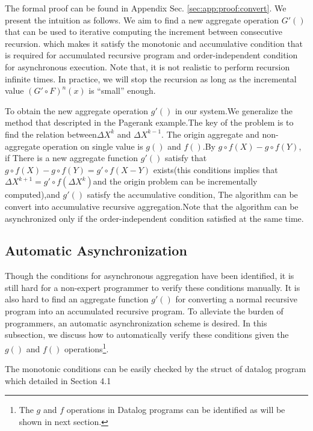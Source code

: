 The formal proof can be found in Appendix Sec. \ref{sec:app:proof:convert}. We present the intuition as follows. We aim to find a new aggregate operation $G'()$ that can be used to iterative computing the increment between consecutive recursion. which makes it satisfy the monotonic and accumulative condition that is required for accumulated recursive program and order-independent condition for asynchronous execution.
Note that, it is not realistic to perform recursion infinite times. In practice, we will stop the recursion as long as the incremental value $(G'\circ F)^n(x)$ is ``small'' enough.

To obtain the new aggregate operation $g'()$ in our system.We generalize the method that descripted in the Pagerank example.The key of the problem is to find the relation between$\Delta X^k$ and $\Delta X^{k-1}$. The origin aggregate and non-aggregate operation on single value is $g()$ and $f()$.By $g\circ f(X)-g\circ f(Y)$, if There is a new aggregate function $g'()$ satisfy that $g\circ f(X)-g\circ f(Y) =g'\circ f(X-Y)$ exists(this conditions implies that $\Delta X^{k+1}=g'\circ f(\Delta X^{k})$and the origin problem can be incrementally computed),and $g'()$ satisfy the accumulative condition, The algorithm can be convert into accumulative recursive aggregation.Note that the algorithm can be asynchronized only if the order-independent condition satisfied at the same time.





\subsection{Automatic Asynchronization}
\label{sec:async:autoasync}

Though the conditions for asynchronous aggregation have been identified, it is still hard for a non-expert programmer to verify these conditions manually. It is also hard to find an aggregate function $g'()$ for converting a normal recursive program into an accumulated recursive program.
 To alleviate the burden of programmers, an automatic asynchronization scheme is desired. In this subsection, we discuss how to automatically verify these conditions given the $g()$ and $f()$ operations\footnote{The $g$ and $f$ operations in Datalog programs can be identified as will be shown in next section.}.
 
 
 The monotonic conditions can  be easily checked by the struct of datalog program which detailed in Section 4.1

